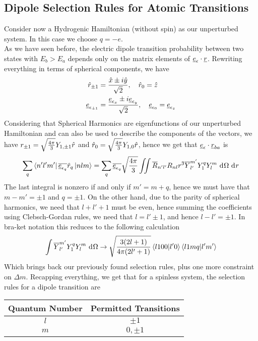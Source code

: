 \documentclass[../qm.tex]{subfiles}
\begin{document}
	\subsection{Dipole Selection Rules for Atomic Transitions}
	Consider now a Hydrogenic Hamiltonian (without spin) as our unperturbed system. In this case we choose $q=-e$.\\
	As we have seen before, the electric dipole transition probability between two states with $E_b>E_a$ depends only on the matrix elements of $\underline{e}_{\epsilon}\cdot\underline{r}$. Rewriting everything in terms of spherical components, we have
	\begin{equation}
		\begin{aligned}
			\hat{r}_{\pm1}&=\frac{\hat{x}\pm i\hat{y}}{\sqrt{2}},\quad\hat{r}_0=\hat{z}\\
			\underline{e}_{\epsilon_{\pm1}}&=\frac{\underline{e}_{\epsilon_x}\pm i\underline{e}_{\epsilon_y}}{\sqrt{2}},\quad\underline{e}_{\epsilon_0}=\underline{e}_{\epsilon_z}
		\end{aligned}
		\label{eq:sphcoord}
	\end{equation}
	Considering that Spherical Harmonics are eigenfunctions of our unperturbed Hamiltonian and can also be used to describe the components of the vectors, we have $r_{\pm1}=\sqrt{\frac{4\pi}{3}}Y_{1,\pm1}\hat{r}$ and $\hat{r}_0=\sqrt{\frac{4\pi}{3}}Y_{1,0}\hat{r}$, hence we get that $\underline{e}_{\epsilon}\cdot\underline{r}_{ba}$ is
	\begin{equation}
		\sum_q\bra{n'l'm'}\overline{\underline{e}_{\epsilon_q}}\hat{r}_q\ket{nlm}=\sum_q\overline{\underline{e}_{\epsilon_q}}\sqrt{\frac{4\pi}{3}}\iint\overline{R}_{n'l'}R_{nl}r^3\overline{Y}^{m'}_{l'}Y_{1}^qY^m_l\ \mathrm{d}^{}\Omega\ \mathrm{d}^{}r
		\label{eq:selrulesdippolarization}
	\end{equation}
	The last integral is nonzero if and only if $m'=m+q$, hence we must have that $m-m'=\pm1$ and $q=\pm1$. On the other hand, due to the parity of spherical harmonics, we need that $l+l'+1$ must be even, hence summing the coefficients using Clebsch-Gordan rules, we need that $l=l'\pm1$, and hence $l-l'=\pm1$. In bra-ket notation this reduces to the following calculation
	\begin{equation}
		\int\overline{Y}_{l'}^{m'}Y^q_1Y^m_l\ \mathrm{d}^{}\Omega\to\sqrt{\frac{3(2l+1)}{4\pi(2l'+1)}}\bra{l100}\ket{l'0}\bra{l1mq}\ket{l'm'}
		\label{eq:cgtableselrule}
	\end{equation}
	Which brings back our previously found selection rules, plus one more constraint on $\Delta m$. Recapping everything, we get that for a spinless system, the selection rules for a dipole transition are
	\begin{table}[H]
		\centering
		\begin{tabular}{|c|c|}
			\hline
			Quantum Number&Permitted Transitions\\
			\hline
			$l$&$\pm1$\\
			\hline
			$m$&$0,\pm1$\\
			\hline
		\end{tabular}
		\label{tab:selectionrulesspinless}
	\end{table}
\end{document}
